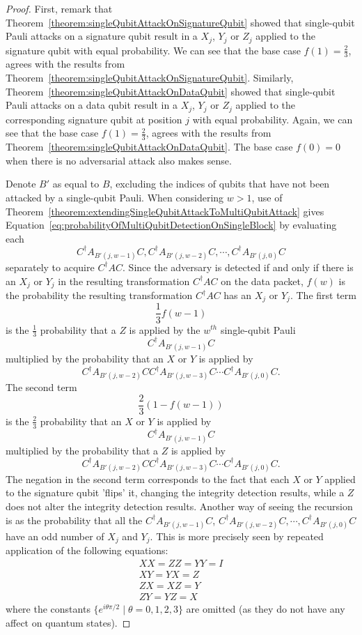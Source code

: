 \begin{proof}
First, remark that
Theorem~\ref{theorem:singleQubitAttackOnSignatureQubit} showed that single-qubit Pauli attacks on a signature qubit result in a $X_j$, $Y_j$ or $Z_j$ applied to the signature qubit with equal probability. We can see that the base case $f(1) = \frac{2}{3}$, agrees with the results from Theorem~\ref{theorem:singleQubitAttackOnSignatureQubit}. Similarly, Theorem~\ref{theorem:singleQubitAttackOnDataQubit} showed that single-qubit Pauli attacks on a data qubit result in a $X_j$, $Y_j$ or $Z_j$ applied to the corresponding signature qubit at position $j$ with equal probability. Again, we can see that the base case $f(1) = \frac{2}{3}$, agrees with the results from Theorem~\ref{theorem:singleQubitAttackOnDataQubit}. The base case $f(0) = 0$ when there is no adversarial attack also makes sense.

Denote $B'$ as equal to $B$, excluding the indices of qubits that have not been attacked by a single-qubit Pauli. When considering $w > 1$, use of Theorem~\ref{theorem:extendingSingleQubitAttackToMultiQubitAttack} gives Equation~\eqref{eq:probabilityOfMultiQubitDetectionOnSingleBlock} by evaluating each $$C^{\dagger}A_{B'(j,w-1)}C, C^{\dagger}A_{B'(j,w-2)}C, \cdots ,C^{\dagger}A_{B'(j,0)}C$$ separately to acquire $C^{\dagger}AC$. Since the adversary is detected if and only if there is an $X_j$ or $Y_j$ in the resulting transformation $C^{\dagger}AC$ on the data packet, $f(w)$ is the probability the resulting transformation $C^{\dagger}AC$ has an $X_j$ or $Y_j$. The first term $$\frac{1}{3}f(w - 1)$$
is the $\frac{1}{3}$ probability that a $Z$ is applied by the $w^{th}$ single-qubit Pauli
$$C^{\dagger}A_{B'(j,w-1)}C$$
multiplied by the probability that an $X$ or $Y$ is applied by $$C^{\dagger}A_{B'(j,w-2)}C C^{\dagger}A_{B'(j,w-3)}C \cdots C^{\dagger}A_{B'(j,0)}C.$$ The second term
$$\frac{2}{3}(1 - f(w - 1))$$ 
is the $\frac{2}{3}$ probability that an $X$ or $Y$ is applied by
$$C^{\dagger}A_{B'(j,w-1)}C$$
multiplied by the probability that a $Z$ is applied by $$C^{\dagger}A_{B'(j,w-2)}C C^{\dagger}A_{B'(j,w-3)}C \cdots C^{\dagger}A_{B'(j,0)}C.$$ The negation in the second term corresponds to the fact that each $X$ or $Y$ applied to the signature qubit 'flips' it, changing the integrity detection results, while a $Z$ does not alter the integrity detection results. Another way of seeing the recursion is as the probability that all the $C^{\dagger}A_{B'(j,w-1)}C$, $C^{\dagger}A_{B'(j,w-2)}C, \cdots ,C^{\dagger}A_{B'(j,0)}C$ have an odd number of $X_j$ and $Y_j$. This is more precisely seen by repeated application of the following equations:
\begin{align}
XX = ZZ = YY = I \\
XY = YX = Z\\
ZX = XZ = Y\\
ZY = YZ = X
\end{align}
where the constants $\{ e^{i\theta\pi/2} \mid \theta = 0,1,2,3\}$ are omitted (as they do not have any affect on quantum states).


\end{proof}
